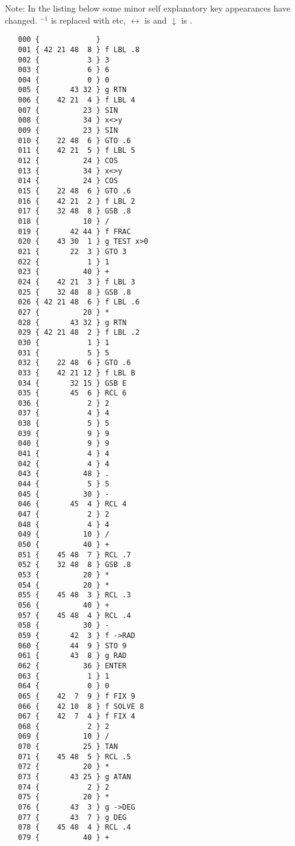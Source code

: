 \documentclass[english,a4paper,onepage, 10pt]{scrbook}
\begin{document}
Note: In the listing below some minor self explanatory key appearances have changed.  $^{-1}$ is replaced with  etc, $\leftrightarrow$ is  and $\downarrow$ is .
\begin{multicols}{2}
\begin{lstlisting}
   000 {             } 
   001 { 42 21 48  8 } f LBL .8
   002 {           3 } 3
   003 {           6 } 6
   004 {           0 } 0
   005 {       43 32 } g RTN
   006 {    42 21  4 } f LBL 4
   007 {          23 } SIN
   008 {          34 } x<>y
   009 {          23 } SIN
   010 {    22 48  6 } GTO .6
   011 {    42 21  5 } f LBL 5
   012 {          24 } COS
   013 {          34 } x<>y
   014 {          24 } COS
   015 {    22 48  6 } GTO .6
   016 {    42 21  2 } f LBL 2
   017 {    32 48  8 } GSB .8
   018 {          10 } /
   019 {       42 44 } f FRAC
   020 {    43 30  1 } g TEST x>0
   021 {       22  3 } GTO 3
   022 {           1 } 1
   023 {          40 } +
   024 {    42 21  3 } f LBL 3
   025 {    32 48  8 } GSB .8
   026 { 42 21 48  6 } f LBL .6
   027 {          20 } *
   028 {       43 32 } g RTN
   029 { 42 21 48  2 } f LBL .2
   030 {           1 } 1
   031 {           5 } 5
   032 {    22 48  6 } GTO .6
   033 {    42 21 12 } f LBL B
   034 {       32 15 } GSB E
   035 {       45  6 } RCL 6
   036 {           2 } 2
   037 {           4 } 4
   038 {           5 } 5
   039 {           9 } 9
   040 {           9 } 9
   041 {           4 } 4
   042 {           4 } 4
   043 {          48 } .
   044 {           5 } 5
   045 {          30 } -
   046 {       45  4 } RCL 4
   047 {           2 } 2
   048 {           4 } 4
   049 {          10 } /
   050 {          40 } +
   051 {    45 48  7 } RCL .7
   052 {    32 48  8 } GSB .8
   053 {          20 } *
   054 {          20 } *
   055 {    45 48  3 } RCL .3
   056 {          40 } +
   057 {    45 48  4 } RCL .4
   058 {          30 } -
   059 {       42  3 } f ->RAD
   060 {       44  9 } STO 9
   061 {       43  8 } g RAD
   062 {          36 } ENTER
   063 {           1 } 1
   064 {           0 } 0
   065 {    42  7  9 } f FIX 9
   066 {    42 10  8 } f SOLVE 8
   067 {    42  7  4 } f FIX 4
   068 {           2 } 2
   069 {          10 } /
   070 {          25 } TAN
   071 {    45 48  5 } RCL .5
   072 {          20 } *
   073 {       43 25 } g ATAN
   074 {           2 } 2
   075 {          20 } *
   076 {       43  3 } g ->DEG
   077 {       43  7 } g DEG
   078 {    45 48  4 } RCL .4
   079 {          40 } +

\end{lstlisting}
\end{multicols}
\end{document}
